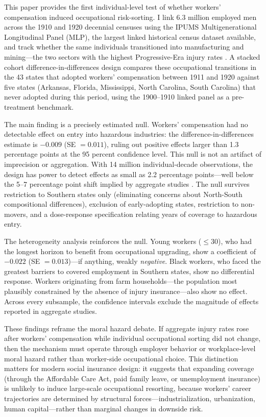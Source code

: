\documentclass[12pt]{article}
\begin{document}
This paper provides the first individual-level test of whether workers' compensation induced occupational risk-sorting. I link 6.3 million employed men across the 1910 and 1920 decennial censuses using the IPUMS Multigenerational Longitudinal Panel (MLP), the largest linked historical census dataset available, and track whether the same individuals transitioned into manufacturing and mining---the two sectors with the highest Progressive-Era injury rates \citep{aldrich1997}. A stacked cohort difference-in-differences design compares these occupational transitions in the 43 states that adopted workers' compensation between 1911 and 1920 against five states (Arkansas, Florida, Mississippi, North Carolina, South Carolina) that never adopted during this period, using the 1900--1910 linked panel as a pre-treatment benchmark.

The main finding is a precisely estimated null. Workers' compensation had no detectable effect on entry into hazardous industries: the difference-in-differences estimate is $-0.009$ (SE $= 0.011$), ruling out positive effects larger than 1.3 percentage points at the 95 percent confidence level. This null is not an artifact of imprecision or aggregation. With 14 million individual-decade observations, the design has power to detect effects as small as 2.2 percentage points---well below the 5--7 percentage point shift implied by aggregate studies \citep{fishback1998}. The null survives restriction to Southern states only (eliminating concerns about North-South compositional differences), exclusion of early-adopting states, restriction to non-movers, and a dose-response specification relating years of coverage to hazardous entry.

The heterogeneity analysis reinforces the null. Young workers ($\leq 30$), who had the longest horizon to benefit from occupational upgrading, show a coefficient of $-0.022$ (SE $= 0.013$)---if anything, weakly \textit{negative}. Black workers, who faced the greatest barriers to covered employment in Southern states, show no differential response. Workers originating from farm households---the population most plausibly constrained by the absence of injury insurance---also show no effect. Across every subsample, the confidence intervals exclude the magnitude of effects reported in aggregate studies.

These findings reframe the moral hazard debate. If aggregate injury rates rose after workers' compensation while individual occupational sorting did not change, then the mechanism must operate through employer behavior or workplace-level moral hazard rather than worker-side occupational choice. This distinction matters for modern social insurance design: it suggests that expanding coverage (through the Affordable Care Act, paid family leave, or unemployment insurance) is unlikely to induce large-scale occupational resorting, because workers' career trajectories are determined by structural forces---industrialization, urbanization, human capital---rather than marginal changes in downside risk.
\end{document}
